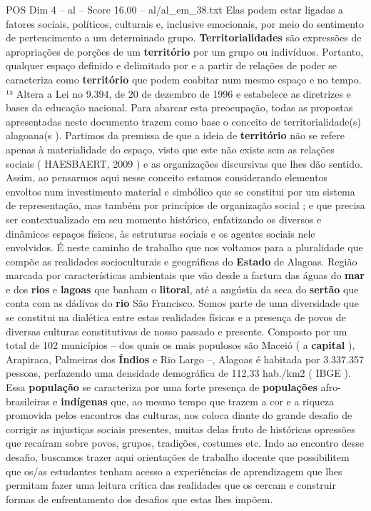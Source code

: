 \begin{textsample}{POS Dim 4 – al – Score 16.00 – al/al\_em\_38.txt}
Elas podem estar ligadas a fatores sociais, políticos, culturais e, inclusive emocionais, por meio do sentimento de pertencimento a um determinado grupo. \textbf{Territorialidades} são expressões de apropriações de porções de um \textbf{território} por um grupo ou indivíduos.
Portanto, qualquer espaço definido e delimitado por e a partir de relações de poder se caracteriza como \textbf{território} que podem coabitar num mesmo espaço e no tempo. ¹³ Altera a Lei no 9.394, de 20 de dezembro de 1996 e estabelece as diretrizes e bases da educação nacional.
Para abarcar esta preocupação, todas as propostas apresentadas neste documento trazem como base o conceito de territorialidade(s) alagoana(s ).
Partimos da premissa de que a ideia de \textbf{território} não se refere apenas à materialidade do espaço, visto que este não existe sem as relações sociais ( HAESBAERT, 2009 ) e as organizações discursivas que lhes dão sentido.
Assim, ao pensarmos aqui nesse conceito estamos considerando elementos envoltos num investimento material e simbólico que se constitui por um sistema de representação, mas também por princípios de organização social ; e que precisa ser contextualizado em seu momento histórico, enfatizando os diversos e dinâmicos espaços físicos, às estruturas sociais e os agentes sociais nele envolvidos.
É neste caminho de trabalho que nos voltamos para a pluralidade que compõe as realidades socioculturais e geográficas do \textbf{Estado} de Alagoas.
Região marcada por características ambientais que vão desde a fartura das águas do \textbf{mar} e dos \textbf{rios} e \textbf{lagoas} que banham o \textbf{litoral}, até a angústia da seca do \textbf{sertão} que conta com as dádivas do \textbf{rio} São Francisco.
Somos parte de uma diversidade que se constitui na dialética entre estas realidades físicas e a presença de povos de diversas culturas constitutivas de nosso passado e presente.
Composto por um total de 102 municípios – dos quais os mais populosos são Maceió ( a \textbf{capital} ), Arapiraca, Palmeiras dos \textbf{Índios} e Rio Largo –, Alagoas é habitada por 3.337.357 pessoas, perfazendo uma densidade demográfica de 112,33 hab./km2 ( IBGE ).
Essa \textbf{população} se caracteriza por uma forte presença de \textbf{populações} afro-brasileiras e \textbf{indígenas} que, ao mesmo tempo que trazem a cor e a riqueza promovida pelos encontros das culturas, nos coloca diante do grande desafio de corrigir as injustiças sociais presentes, muitas delas fruto de históricas opressões que recaíram sobre povos, grupos, tradições, costumes etc.
Indo ao encontro desse desafio, buscamos trazer aqui orientações de trabalho docente que possibilitem que os/as estudantes tenham acesso a experiências de aprendizagem que lhes permitam fazer uma leitura crítica das realidades que os cercam e construir formas de enfrentamento dos desafios que estas lhes impõem.

\end{textsample}
